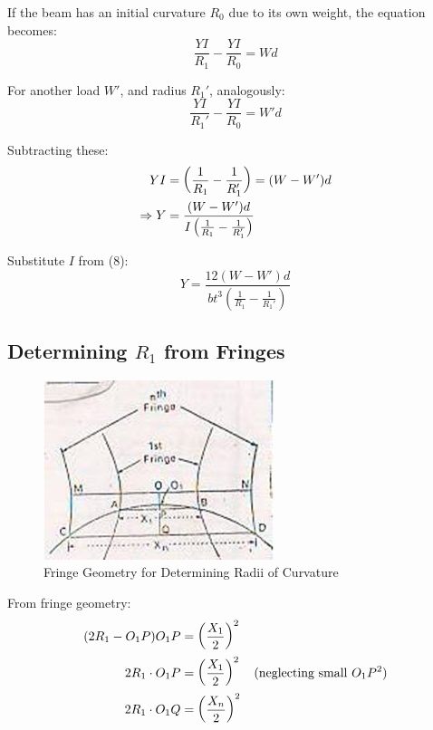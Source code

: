\documentclass[a4paper,11pt]{article}
\begin{document}
If the beam has an initial curvature \( R_0 \) due to its own weight, the equation becomes:
\begin{equation}
\frac{YI}{R_1} - \frac{YI}{R_0} = Wd
\end{equation}

For another load \( W' \), and radius \( R_1' \), analogously:
\begin{equation}
\frac{YI}{R_1'} - \frac{YI}{R_0} = W'd
\end{equation}

Subtracting these:
\begin{align}
YI &= \left( \frac{1}{R_1} - \frac{1}{R_1'} \right) = (W - W')d \notag \\
\Rightarrow Y &= \frac{(W - W')d}{I\left( \frac{1}{R_1} - \frac{1}{R_1'} \right)}
\end{align}

Substitute \( I \) from (8):
\begin{equation}
Y = \frac{12(W - W')d}{bt^3 \left( \frac{1}{R_1} - \frac{1}{R_1'} \right)}
\end{equation}

\subsection*{Determining \( R_1 \) from Fringes}

\begin{figure}[H]
    \centering
    \includegraphics[width=0.6\textwidth]{geometry.png}
    \caption{Fringe Geometry for Determining Radii of Curvature}
\end{figure}

From fringe geometry:
\begin{align}
(2R_1 - O_1P) O_1P &= \left( \frac{X_1}{2} \right)^2 \notag \\
2R_1 \cdot O_1P &= \left( \frac{X_1}{2} \right)^2 \quad \text{(neglecting small } O_1P^2 \text{)}  \\
2R_1 \cdot O_1Q &= \left( \frac{X_n}{2} \right)^2
\end{align}
\end{document}
